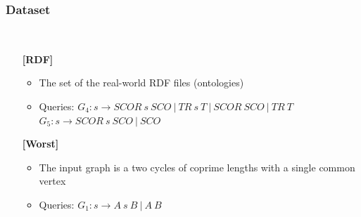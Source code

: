 \documentclass[xcolor=table]{beamer}
\begin{document}
\begin{frame}[fragile] \frametitle{Dataset}
  \begin{minipage}[t]{1cm}
\hspace{1cm}
  \end{minipage}
  ~
\begin{minipage}[t]{0.85\textwidth}
\begin{itemize}
\item[\textbf{[RDF]}]
\begin{itemize}
  \item The set of the real-world RDF files (ontologies)
  \item Queries: $G_4: s \to SCOR \ s \ SCO \ | \ TR \ s \ T \ | \ SCOR \ SCO \ | \ TR \ T$
$G_5: s \to SCOR \ s \ SCO \ | \ SCO$
\end{itemize}

\pause
\item[\textbf{[Worst]}]
\begin{itemize}
  \item The input graph is a two cycles of coprime lengths with a single common vertex
  \begin{figure}
\end{figure}
  \item Queries: $G_1: s \to A \ s \ B \ | \ A \ B$
\end{itemize}
\end{itemize}
\end{minipage}
\end{frame}
\end{document}
